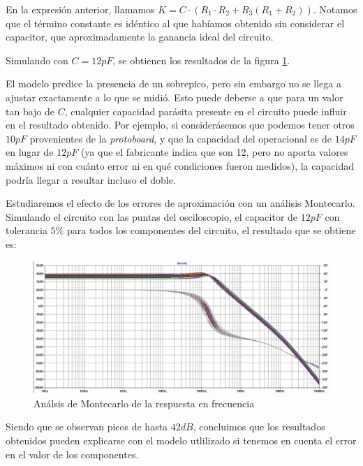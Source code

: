 \documentclass[../../main.tex]{subfiles}
\begin{document}
En la expresi\'on anterior, llamamos $K = C\cdot ( R_1\cdot R_2 + R_3 (R_1 +R_2 ))$. Notamos que el t\'ermino constante es id\'entico al que hab\'iamos obtenido sin considerar el capacitor, que aproximadamente la ganancia ideal del circuito. \par

Simulando con $C=12pF$, se obtienen los resultados de la figura \ref{fig:hf-con-c}.\par

El modelo predice la presencia de un sobrepico, pero sin embargo no se llega a ajustar exactamente a lo que se midi\'o. Esto puede deberse a que para un valor tan bajo de $C$, cualquier capacidad par\'asita presente en el circuito puede influir en el resultado obtenido. Por ejemplo, si consider\'asemos que podemos tener otros $10pF$ provenientes de la \textit{protoboard}, y que la capacidad del operacional es de $14pF$ en lugar de $12pF$ (ya que el fabricante indica que son 12, pero no aporta valores m\'aximos ni con cu\'anto error ni en qu\'e condiciones fueron medidos), la capacidad podr\'ia llegar a resultar incluso el doble. \par

Estudiaremos el efecto de los errores de aproximaci\'on con un an\'alisis Montecarlo. Simulando el circuito con las puntas del osciloscopio, el capacitor de $12pF$ con tolerancia $5\%$ para todos los componentes del circuito, el resultado que se obtiene es:

\begin{figure} [H]
	\centering
	\includegraphics[scale=0.4]{fotos/tc_tp2_ej2_mc_bode.jpg}
	\caption{An\'alsis de Montecarlo de la respuesta en frecuencia}
	\label{fig:hf-con-c}
\end{figure}

Siendo que se observan picos de hasta $42dB$, concluimos que los resultados obtenidos pueden explicarse con el modelo utlilizado si tenemos en cuenta el error en el valor de los componentes.\par
\end{document}
